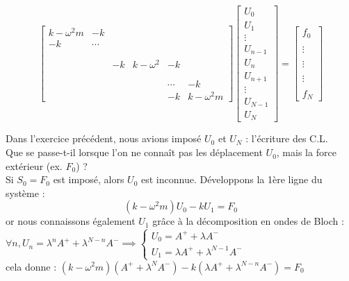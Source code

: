 \documentclass[12pt,a4paper]{article}
\begin{document}
	\[
	\begin{bmatrix}
		k-\omega^2 m & -k \\
		-k & \cdots \\\\\\
		& &  - k & k-\omega^2 & -k \\\\\\
		& & & & \cdots & -k \\
		& & & & -k & k-\omega^2 m
	\end{bmatrix}\begin{bmatrix}
	U_0 \\  U_1 \\ \vdots \\ U_{n-1}\\U_n \\ U_{n+1} \\\vdots\\U_{N-1}\\U_N
	\end{bmatrix} = \begin{bmatrix}
	f_0 \\ \\ 
	\vdots\\ \\
	\vdots\\ \\
	\vdots\\ \\
	f_N
	\end{bmatrix}
	\]
	
	Dans l'exercice précédent, nous avions imposé $U_0$ et $U_N$ : l'écriture des C.L.\\
	Que se passe-t-il lorsque l'on ne connaît pas les déplacement $U_0$, mais la force extérieur (ex. $F_0$) ?\\
	
	Si \underline{$S_0 =F_0$} est imposé, alors $U_0$ est inconnue. Développons la 1ère ligne du système :
	\[
	(k-\omega^2 m)U_0-kU_1 = F_0
	\] 
	or nous connaissons également $U_1$ grâce à la décomposition en ondes de Bloch : $\forall n, U_n = \lambda^n A^+ + \lambda^{N-n}A^- \implies\begin{cases}
		U_0 = A^+ + \lambda A^- \\
		U_1 = \lambda A^+ +\lambda^{N-1}A^-
	\end{cases}$\\
	cela donne : $(k-\omega^2 m)(A^+ + \lambda^N A^-) - k(\lambda A^+ + \lambda^{N-n}A^-) = F_0$\\
	
\end{document}
